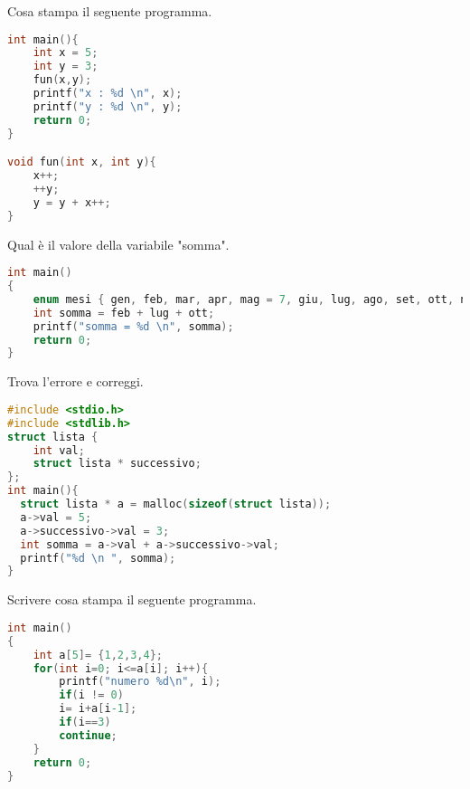 \documentclass[addpoints,11pt]{exam}
\begin{document}
\begin{questions}
\question[2]
Cosa stampa il seguente programma.

\begin{minipage}[t]{0.4\linewidth}
	
		\begin{lstlisting}[language=C]
int main(){
    int x = 5;
    int y = 3;
    fun(x,y);
    printf("x : %d \n", x);  
    printf("y : %d \n", y);  
    return 0;
}

void fun(int x, int y){
    x++;
    ++y;
    y = y + x++;
}
\end{lstlisting}
\end{minipage}
\begin{minipage}[t]{0.6\linewidth}
	\makeemptybox{160pt}
\end{minipage}






\question[2] Qual è il valore della variabile "somma".

\begin{minipage}[t]{0.6\linewidth}
	\begin{lstlisting}[language=C]
int main()
{
    enum mesi { gen, feb, mar, apr, mag = 7, giu, lug, ago, set, ott, nov, dic };
    int somma = feb + lug + ott;
    printf("somma = %d \n", somma); 
    return 0;
}
\end{lstlisting}
\end{minipage}
\begin{minipage}[t]{0.4\linewidth}
	\makeemptybox{170pt}
\end{minipage}


\question[2] Trova l'errore e correggi.

\begin{minipage}[t]{0.6\linewidth}
	\begin{lstlisting}[language=C]
#include <stdio.h>
#include <stdlib.h>
struct lista {
    int val;
    struct lista * successivo;
};
int main(){
  struct lista * a = malloc(sizeof(struct lista));
  a->val = 5;
  a->successivo->val = 3;
  int somma = a->val + a->successivo->val;
  printf("%d \n ", somma);
}
\end{lstlisting}
\end{minipage}
\begin{minipage}[t]{0.4\linewidth}
	\makeemptybox{170pt}
\end{minipage}



\question[3] Scrivere cosa stampa il seguente programma.

\begin{minipage}[t]{0.55\linewidth}
	\begin{lstlisting}[language=C]
int main()
{
    int a[5]= {1,2,3,4};
    for(int i=0; i<=a[i]; i++){
        printf("numero %d\n", i);
        if(i != 0)
        i= i+a[i-1];
        if(i==3)
        continue;
    }
    return 0;
}
\end{lstlisting}
\end{minipage}
\begin{minipage}[t]{0.45\linewidth}
	\makeemptybox{170pt}
\end{minipage}




\end{questions}
\end{document}
